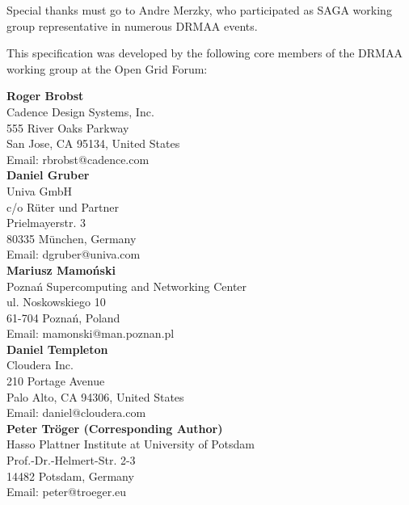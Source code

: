 \documentclass{article}
\begin{document}
Special thanks must go to Andre Merzky, who participated as SAGA working group representative in numerous DRMAA events. 

This specification was developed by the following core members of the DRMAA working group at the Open Grid Forum:

\begin{samepage}
\textbf{Roger Brobst}\\
Cadence Design Systems, Inc.\\
555 River Oaks Parkway \\
San Jose, CA 95134, United States\\
Email: rbrobst@cadence.com\\  

\textbf{Daniel Gruber}\\
Univa GmbH\\
c/o Rüter und Partner\\
Prielmayerstr. 3\\
80335 München, Germany\\
Email: dgruber@univa.com\\

\textbf{Mariusz Mamoński}\\
Poznań Supercomputing and Networking Center\\
ul. Noskowskiego 10\\
61-704 Poznań, Poland\\
Email: mamonski@man.poznan.pl\\ 

\textbf{Daniel Templeton} \\
Cloudera Inc.\\
210 Portage Avenue\\
Palo Alto, CA 94306, United States\\
Email: daniel@cloudera.com\\

\textbf{Peter Tröger (Corresponding Author)} \\
Hasso Plattner Institute at University of Potsdam \\
Prof.-Dr.-Helmert-Str. 2-3 \\
14482 Potsdam, Germany \\
Email: peter@troeger.eu \\
\end{samepage}

\end{document}
